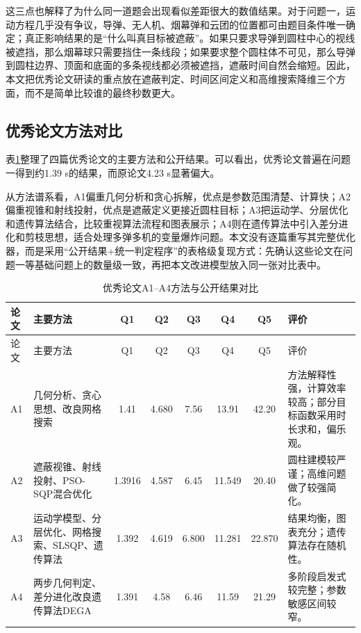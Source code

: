 \documentclass[12pt,a4paper]{article}
\begin{document}
这三点也解释了为什么同一道题会出现看似差距很大的数值结果。对于问题一，运动方程几乎没有争议，导弹、无人机、烟幕弹和云团的位置都可由题目条件唯一确定；真正影响结果的是“什么叫真目标被遮蔽”。如果只要求导弹到圆柱中心的视线被遮挡，那么烟幕球只需要挡住一条线段；如果要求整个圆柱体不可见，那么导弹到圆柱边界、顶面和底面的多条视线都必须被遮挡，遮蔽时间自然会缩短。因此，本文把优秀论文研读的重点放在遮蔽判定、时间区间定义和高维搜索降维三个方面，而不是简单比较谁的最终秒数更大。

\subsection{优秀论文方法对比}

表\ref{tab:paper_methods}整理了四篇优秀论文的主要方法和公开结果。可以看出，优秀论文普遍在问题一得到约1.39 s的结果，而原论文4.23 s显著偏大。

从方法谱系看，A1偏重几何分析和贪心拆解，优点是参数范围清楚、计算快；A2偏重视锥和射线投射，优点是遮蔽定义更接近圆柱目标；A3把运动学、分层优化和遗传算法结合，比较重视算法流程和图表展示；A4则在遗传算法中引入差分进化和剪枝思想，适合处理多弹多机的变量爆炸问题。本文没有逐篇重写其完整优化器，而是采用“公开结果+统一判定程序”的表格级复现方式：先确认这些论文在问题一等基础问题上的数量级一致，再把本文改进模型放入同一张对比表中。

\begin{longtable}{p{0.8cm}p{3.7cm}ccccc p{3.5cm}}
\caption{优秀论文A1--A4方法与公开结果对比}\label{tab:paper_methods}\\
\toprule
论文 & 主要方法 & Q1 & Q2 & Q3 & Q4 & Q5 & 评价\\
\midrule
\endfirsthead
\toprule
论文 & 主要方法 & Q1 & Q2 & Q3 & Q4 & Q5 & 评价\\
\midrule
\endhead
A1 & 几何分析、贪心思想、改良网格搜索 & 1.41 & 4.680 & 7.56 & 13.91 & 42.20 & 方法解释性强，计算效率较高；部分目标函数采用时长求和，偏乐观。\\
A2 & 遮蔽视锥、射线投射、PSO-SQP混合优化 & 1.3916 & 4.587 & 6.45 & 11.549 & 20.40 & 圆柱建模较严谨；高维问题做了较强简化。\\
A3 & 运动学模型、分层优化、网格搜索、SLSQP、遗传算法 & 1.392 & 4.619 & 6.800 & 11.281 & 22.870 & 结果均衡，图表充分；遗传算法存在随机性。\\
A4 & 两步几何判定、差分进化改良遗传算法DEGA & 1.391 & 4.58 & 6.46 & 11.59 & 21.29 & 多阶段启发式较完整；参数敏感区间较窄。\\
\bottomrule
\end{longtable}
\end{document}
